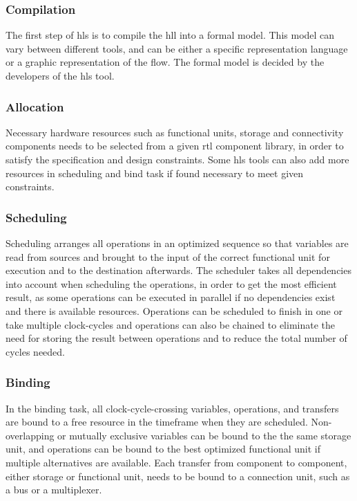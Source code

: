 \subsubsection{Compilation}

The first step of \gls{hls} is to compile the \gls{hll} into a formal model. This model can vary between different tools, and can be either a specific representation language or a graphic representation of the flow. The formal model is decided by the developers of the \gls{hls} tool. 

\subsubsection{Allocation}

Necessary hardware resources such as functional units, storage and connectivity components needs to be selected from a given \gls{rtl} component library, in order to satisfy the specification and design constraints. Some \gls{hls} tools can also add more resources in scheduling and bind task if found necessary to meet given constraints.

\subsubsection{Scheduling}
Scheduling arranges all operations in an optimized sequence so that variables are read from sources and brought to the input of the correct functional unit for execution and to the destination afterwards. The scheduler takes all dependencies into account when scheduling the operations, in order to get the most efficient result, as some operations can be executed in parallel if no dependencies exist and there is available resources. Operations can be scheduled to finish in one or take multiple clock-cycles and operations can also be chained to eliminate the need for storing the result between operations and to reduce the total number of cycles needed. 
\subsubsection{Binding}
In the binding task, all clock-cycle-crossing variables, operations, and transfers are bound to a free resource in the timeframe when they are scheduled. Non-overlapping or mutually exclusive variables can be bound to the the same storage unit, and operations can be bound to the best optimized functional unit if multiple alternatives are available. Each transfer from component to component, either storage or functional unit, needs to be bound to a connection unit, such as a bus or a multiplexer.
